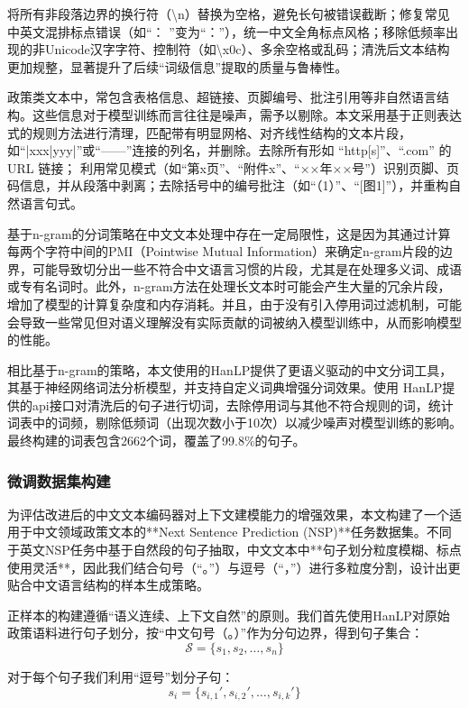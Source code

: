 \documentclass[12pt, a4paper]{ctexart}
\begin{document}
将所有非段落边界的换行符（\textbackslash n）替换为空格，避免长句被错误截断；修复常见中英文混排标点错误（如“： ”变为“：”），统一中文全角标点风格；移除低频率出现的非Unicode汉字字符、控制符（如\textbackslash x0c）、多余空格或乱码；清洗后文本结构更加规整，显著提升了后续“词级信息”提取的质量与鲁棒性。

政策类文本中，常包含表格信息、超链接、页脚编号、批注引用等非自然语言结构。这些信息对于模型训练而言往往是噪声，需予以剔除。本文采用基于正则表达式的规则方法进行清理，匹配带有明显网格、对齐线性结构的文本片段，如“|xxx|yyy|”或“——”连接的列名，并删除。去除所有形如 “http[s]”、“.com” 的 URL 链接；
利用常见模式（如“第x页”、“附件x”、“××年××号”）识别页脚、页码信息，并从段落中剥离；去除括号中的编号批注（如“（1）”、“[图1]”），并重构自然语言句式。

基于n-gram的分词策略在中文文本处理中存在一定局限性，这是因为其通过计算每两个字符中间的PMI（Pointwise Mutual Information）来确定n-gram片段的边界，可能导致切分出一些不符合中文语言习惯的片段，尤其是在处理多义词、成语或专有名词时。此外，n-gram方法在处理长文本时可能会产生大量的冗余片段，增加了模型的计算复杂度和内存消耗。并且，由于没有引入停用词过滤机制，可能会导致一些常见但对语义理解没有实际贡献的词被纳入模型训练中，从而影响模型的性能。

相比基于n-gram的策略，本文使用的HanLP提供了更语义驱动的中文分词工具，其基于神经网络词法分析模型，并支持自定义词典增强分词效果。使用 HanLP提供的api接口对清洗后的句子进行切词，去除停用词与其他不符合规则的词，统计词表中的词频，剔除低频词（出现次数小于10次）以减少噪声对模型训练的影响。最终构建的词表包含2662个词，覆盖了99.8\%的句子。

\subsubsection{微调数据集构建}
为评估改进后的中文文本编码器对上下文建模能力的增强效果，本文构建了一个适用于中文领域政策文本的**Next Sentence Prediction (NSP)**任务数据集。不同于英文NSP任务中基于自然段的句子抽取，中文文本中**句子划分粒度模糊、标点使用灵活**，因此我们结合句号（“。”）与逗号（“，”）进行多粒度分割，设计出更贴合中文语言结构的样本生成策略。

正样本的构建遵循“语义连续、上下文自然”的原则。我们首先使用HanLP对原始政策语料进行句子划分，按“中文句号（。）”作为分句边界，得到句子集合：
\begin{equation}
\mathcal{S} = \{s_1, s_2, \ldots, s_n\}
\end{equation}

对于每个句子我们利用“逗号”划分子句：
\begin{equation}
s_i = \{s_{i,1}', s_{i,2}', \ldots, s_{i,k}'\}
\end{equation}
\end{document}
